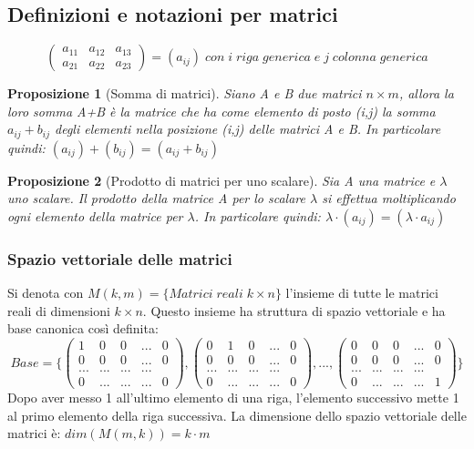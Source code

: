 \documentclass[12pt]{article}
\newenvironment{para}{\begin{adjustwidth}{13mm}{}}{\end{adjustwidth}}
\newtheorem{Proposizione}{Proposizione}[subsection]
\begin{document}
\begin{para}
\subsection{Definizioni e notazioni per matrici}
$$\begin{pmatrix}
a_{11} & a_{12} & a_{13}\\
a_{21} & a_{22} & a_{23}
\end{pmatrix} = (a_{ij}) \; con\; i\; riga\; generica\; e\; j\; colonna\; generica$$

\begin{Proposizione}[Somma di matrici] Siano A e B due matrici $n \times m$, allora la loro somma A+B è la matrice che ha come elemento di posto (i,j) la somma $a_{ij} + b_{ij}$ degli elementi nella posizione (i,j) delle matrici A e B. In particolare quindi: $(a_{ij}) + (b_{ij}) = (a_{ij} + b_{ij})$
\end{Proposizione}

\begin{Proposizione}[Prodotto di matrici per uno scalare]
Sia A una matrice e $\lambda$ uno scalare. Il prodotto della matrice A per lo scalare $\lambda$ si effettua moltiplicando ogni elemento della matrice per $\lambda$. In particolare quindi: $\lambda \cdot (a_{ij}) = (\lambda \cdot a_{ij})$
\end{Proposizione}

\subsubsection{Spazio vettoriale delle matrici}
Si denota con $M(k, m) = \{Matrici \; reali \; k \times n\}$ l'insieme di tutte le matrici reali di dimensioni $k \times n$. Questo insieme ha struttura di spazio vettoriale e ha base canonica così definita:
$$Base = \{\begin{pmatrix}
1 & 0 & 0 & ... & 0\\
0 & 0 & 0 & ...  & 0\\
... & ... & ... & ... \\
0 & ... & ... & ... & 0
\end{pmatrix}, \begin{pmatrix}
    0 & 1 & 0 & ... & 0\\
    0 & 0 & 0 & ...  & 0\\
    ... & ... & ... & ... \\
    0 & ... & ... & ... & 0
\end{pmatrix}, ..., \begin{pmatrix}
    0 & 0 & 0 & ... & 0\\
    0 & 0 & 0 & ...  & 0\\
    ... & ... & ... & ... \\
    0 & ... & ... & ... & 1
\end{pmatrix} \}$$ Dopo aver messo 1 all'ultimo elemento di una riga, l'elemento successivo mette 1 al primo elemento della riga successiva. La dimensione dello spazio vettoriale delle matrici è: $dim(M(m,k)) = k \cdot m$

\end{para}
\end{document}
